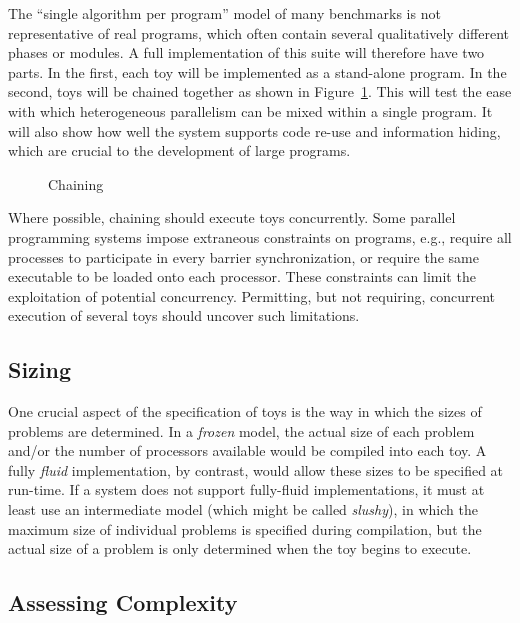 The ``single algorithm per program'' model of many benchmarks is not representative of real programs,
which often contain several qualitatively different phases or modules.
A full implementation of this suite will therefore have two parts.
In the first,
each toy will be implemented as a stand-alone program.
In the second,
toys will be chained together as shown in Figure~\ref{f:chaining}.
This will test the ease with which heterogeneous parallelism can be mixed within a single program.
It will also show how well the system supports code re-use and information hiding,
which are crucial to the development of large programs.

\begin{figure}
\caption{Chaining\label{f:chaining}}
\end{figure}

Where possible,
chaining should execute toys concurrently.
Some parallel programming systems impose extraneous constraints on programs,
e.g., require all processes to participate in every barrier synchronization,
or require the same executable to be loaded onto each processor.
These constraints can limit the exploitation of potential concurrency.
Permitting, but not requiring, concurrent execution of several toys should uncover such limitations.

\subsection{Sizing\label{s:method-size}}

One crucial aspect of the specification of toys is
the way in which the sizes of problems are determined.
In a \emph{frozen} model,
the actual size of each problem and/or the number of processors available would be compiled into each toy.
A fully \emph{fluid} implementation, by contrast, would allow these sizes to be specified at run-time.
If a system does not support fully-fluid implementations,
it must at least use an intermediate model (which might be called \emph{slushy}),
in which the maximum size of individual problems is specified during compilation,
but the actual size of a problem is only determined when the toy begins to execute.

\subsection{Assessing Complexity\label{s:method-complex}}

